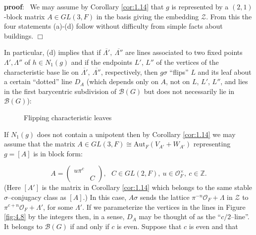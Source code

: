 \documentclass[12pt,letterpaper]{amsart}
\numberwithin{equation}{section}
\theoremstyle{definition}
\theoremstyle{plain}
\providecommand{\cal}{\mathcal}
\def\zz{{\cal Z}}
\def\zzz{\mathbb{Z}}
\def\pf{{\bf proof}:\ }
\def\qed{$\Box$}
\def\off{{\cal O}_F}
\def\bbg{{\cal B}(G)}
\begin{document}
\pf
We may assume by Corollary \ref{cor:1.14} that $g$ is represented by a 
$(2,1)$-block matrix $A\in GL(3,F)$ in the basis giving the embedding
$\zz$. From this the four statements (a)-(d) follow without difficulty
from simple facts about buildings. 
\qed

In particular, (d) implies that if $\overline{\Lambda '},
\ \overline{\Lambda ''}$ are lines associated to two fixed points
$\Lambda ', \Lambda ''$ of $h \in N_1(g)$ and if the endpoints $L'$, $L''$
of the vertices of the characteristic base lie on $\overline{\Lambda '},
\ \overline{\Lambda ''}$, respectively, then $g\sigma$ ``flips'' $L$
and its leaf about a certain ``dotted'' line $D_A$ (which depends only
on $A$, not on $L$, $L'$, $L''$, and lies in the first barycentric
subdivision of $\bbg$ but does not necessarily lie in $\bbg$):


\begin{figure}[htbp]
\centering
{}
\caption{Flipping characteristic leaves \label{fig:4.10}}
\end{figure}

\noindent
If $N_1(g)$ does not contain a unipotent then by Corollary 
\ref{cor:1.14} we may assume that the
matrix $A\in GL(3,F)\cong \text{Aut}_F(V_{A'}+W_{A'})$ 
representing $g=[A]$ is in block form:

\begin{equation}
\label{eqn:4.11}
A = 
\left(
\begin{array}{cc}
u\pi^c&\ \\\ &C
\end{array}
\right) ,
\ \ \ C\in GL(2,F),\ u\in \off^{\times},\ c\in\zzz . 
\end{equation}
(Here $[A']$ is the matrix in Corollary \ref{cor:1.14} 
which belongs to the same stable
$\sigma$--conjugacy class as $[A]$.)
In this case, $A\sigma$ sends the lattice $\pi^{-n}\off +\Lambda$ in $\zz$ to
$\pi^{c+n}\off +\Lambda '$, for some $\Lambda '$. If we parameterize
the vertices in the lines in Figure \ref{fig:4.8} 
by the integers then, in a sense, 
$D_A$ may be thought of 
as the ``$c/2$--line''. It belongs to $\bbg$ if and only if $c$ is even. 
Suppose that $c$ is even and that 
\end{document}
